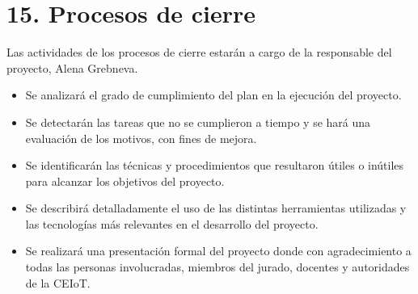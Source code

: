 \documentclass[
11pt, %
]{charter}
\begin{document}
\section{15. Procesos de cierre}    
\label{sec:cierre}
Las actividades de los procesos de cierre estarán a cargo de la responsable del proyecto, Alena Grebneva.

\begin{itemize}
	\item Se analizará el grado de cumplimiento del plan en la ejecución del proyecto.
	\item Se detectarán las tareas que no se cumplieron a tiempo y se hará una evaluación de los motivos, con fines de mejora.
	\item Se identificarán las técnicas y procedimientos que resultaron útiles o inútiles para alcanzar los objetivos del proyecto. 
	\item Se describirá detalladamente el uso de las distintas herramientas utilizadas y las tecnologías más relevantes en el desarrollo del proyecto.
	\item Se realizará una presentación formal del proyecto donde con agradecimiento a todas las personas involucradas, miembros del jurado, docentes y autoridades de la CEIoT.
\end{itemize}
\end{document}
